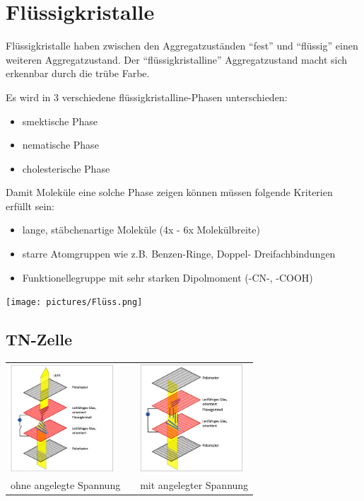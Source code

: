 \section{Flüssigkristalle}
    Flüssigkristalle haben zwischen den Aggregatzuständen ``fest'' und ``flüssig'' einen weiteren Aggregatzustand. Der ``flüssigkristalline'' Aggregatzustand macht sich erkennbar durch die trübe Farbe.        

    Es wird in 3 verschiedene flüssigkristalline-Phasen unterschieden:
    \begin{itemize}
        \item smektische Phase
        \item nematische Phase
        \item cholesterische Phase
    \end{itemize}
    Damit Moleküle eine solche Phase zeigen können müssen folgende Kriterien erfüllt sein:
    \begin{itemize}
        \item lange, stäbchenartige Moleküle (4x - 6x Molekülbreite)
        \item starre Atomgruppen wie z.B. Benzen-Ringe, Doppel- Dreifachbindungen
        \item Funktionellegruppe mit sehr starken Dipolmoment (-CN-, -COOH)
    \end{itemize}
    \vspace{-0.2cm}
    \begin{center}
        \texttt{[image: pictures/Flüss.png]}
    \end{center}
    \vspace{-0.5cm}

\subsection{TN-Zelle}
    \begin{tabular}{lll}
        \includegraphics[height=4cm]{pictures/TN-Zelle1.png} & &   \includegraphics[height=4cm]{pictures/TN-Zelle2.png} \\
        ohne angelegte Spannung  & &  mit angelegter Spannung 
    \end{tabular}
